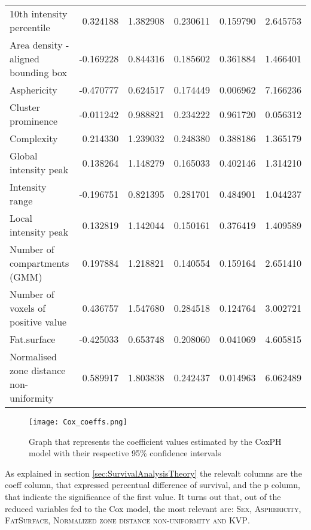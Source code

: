 \begin{table}
\begin{adjustbox}{width=\linewidth}
\begin{tabular}{|lrrrrr|}
10th intensity percentile             			&  0.324188 &   1.382908 &  0.230611 &        0.159790 &  2.645753 \\
Area density - aligned bounding box     	& -0.169228 &   0.844316 &  0.185602 &        0.361884 &  1.466401 \\
Asphericity                             			& -0.470777 &   0.624517 &  0.174449 &         0.006962 &  7.166236 \\
Cluster prominence                      		& -0.011242 &   0.988821 &  0.234222 &        0.961720 &  0.056312 \\
Complexity                              			&  0.214330 &   1.239032 &  0.248380 &         0.388186 &  1.365179 \\
Global intensity peak                   		&  0.138264 &   1.148279 &  0.165033 &         0.402146 &  1.314210 \\
Intensity range                        			& -0.196751 &   0.821395 &  0.281701 &        0.484901 &  1.044237 \\
Local intensity peak                    			&  0.132819 &   1.142044 &  0.150161 &        0.376419 &  1.409589 \\
Number of compartments (GMM)            	&  0.197884 &   1.218821 &  0.140554 &         0.159164 &  2.651410 \\
Number of voxels of positive value      		&  0.436757 &   1.547680 &  0.284518 &         0.124764 &  3.002721 \\
Fat.surface                             			& -0.425033 &   0.653748 &  0.208060 &        0.041069 &  4.605815 \\
Normalised zone distance non-uniformity 	&  0.589917 &   1.803838 &  0.242437 &         0.014963 &  6.062489 \\
\bottomrule
\end{tabular}
\end{adjustbox}
\end{table}

\begin{figure}
\caption{Graph that represents the coefficient values estimated by the CoxPH model with their respective 95\% confidence intervals}
\texttt{[image: Cox\_coeffs.png]}
\end{figure}

As explained in section \ref{sec:SurvivalAnalysisTheory} the relevalt columns are the coeff column, that expressed percentual difference of survival, and the p column, that indicate the significance of the first value.
It turns out that, out of the reduced variables fed to the Cox model, the most relevant are: {\scshape Sex, Asphericity, FatSurface, Normalized zone distance non-uniformity and KVP}.

